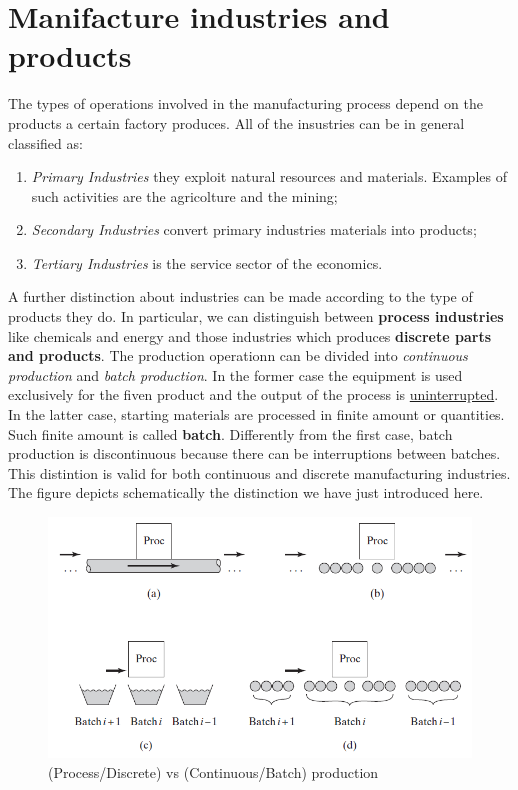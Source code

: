 \section{Manifacture industries and products}
The types of operations involved in the manufacturing process depend on the products a certain factory produces. All of the insustries can be in general classified as:
\begin{enumerate}
    \itemsep-0.3em
    \item \textit{Primary Industries} they exploit natural resources and materials. Examples of such activities are the agricolture and the mining; 
    \item \textit{Secondary Industries} convert primary industries materials into products; 
    \item \textit{Tertiary Industries} is the service sector of the economics.
\end{enumerate}
A further distinction about industries can be made according to the type of products they do. In particular, we can distinguish between \textbf{process industries} like chemicals and energy and those industries which produces \textbf{discrete parts and products}. The production operationn can be divided into \textit{continuous production} and \textit{batch production}. In the former case the equipment is used exclusively for the fiven product and the output of the process is \underline{uninterrupted}. In the latter case, starting materials are  processed in finite amount or quantities. Such finite amount is called \textbf{batch}. Differently from the first case, batch production is discontinuous because there can be interruptions between batches. This distintion is valid for both continuous and discrete manufacturing industries. The figure  depicts schematically the distinction we have just introduced here.

\begin{figure}[h]
    \centering
    \includegraphics[scale=0.7]{img/mani_classification.png}
    \caption{(Process/Discrete) vs (Continuous/Batch) production}
    \label{fig:mani_classes}
\end{figure}

